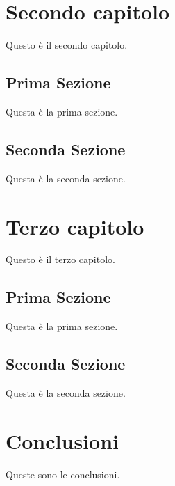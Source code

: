 \documentclass[12pt,a4paper,openright,twoside]{report}
\begin{document}
\clearpage{\pagestyle{empty}\cleardoublepage}
\chapter{Secondo capitolo}

Questo \`e il secondo capitolo.
\section{Prima Sezione}
Questa \`e la prima sezione.

\section{Seconda Sezione}
Questa \`e la seconda sezione.

\clearpage{\pagestyle{empty}\cleardoublepage}
\chapter{Terzo capitolo}

Questo \`e il terzo capitolo.

\section{Prima Sezione}
Questa \`e la prima sezione.

\section{Seconda Sezione}
Questa \`e la seconda sezione.






{}


\clearpage{\pagestyle{empty}\cleardoublepage}
\chapter*{Conclusioni}

 Queste sono le
conclusioni.\\
\end{document}
